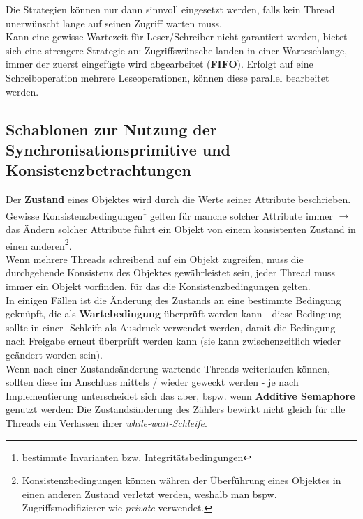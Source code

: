 \noindent
Die Strategien können nur dann sinnvoll eingesetzt werden, falls kein Thread unerwünscht lange auf seinen Zugriff warten muss.\\
Kann eine gewisse Wartezeit für Leser/Schreiber nicht garantiert werden, bietet sich eine strengere Strategie an: Zugriffswünsche landen in einer Warteschlange, immer der zuerst eingefügte wird abgearbeitet (\textbf{FIFO}).
Erfolgt auf eine Schreiboperation mehrere Leseoperationen, können diese parallel bearbeitet werden.


\subsection{Schablonen zur Nutzung der Synchronisationsprimitive und Konsistenzbetrachtungen}

Der \textbf{Zustand} eines Objektes wird durch die Werte seiner Attribute beschrieben.\\

\noindent
Gewisse Konsistenzbedingungen\footnote{bestimmte Invarianten bzw. Integritätsbedingungen} gelten für manche solcher Attribute immer $\rightarrow$ das Ändern solcher Attribute führt ein Objekt von einem konsistenten Zustand in einen anderen\footnote{
Konsistenzbedingungen können währen der Überführung eines Objektes in einen anderen Zustand verletzt werden, weshalb man bspw. Zugriffsmodifizierer wie \textit{private} verwendet.
}.\\

\noindent
Wenn mehrere Threads schreibend auf ein Objekt zugreifen, muss die durchgehende Konsistenz des Objektes gewährleistet sein, jeder Thread muss immer ein Objekt vorfinden, für das die Konsistenzbedingungen gelten.\\

\noindent
In einigen Fällen ist die Änderung des Zustands an eine bestimmte Bedingung geknüpft, die als \textbf{Wartebedingung} überprüft werden kann - diese Bedingung sollte in einer -Schleife als Ausdruck verwendet werden, damit die Bedingung nach Freigabe erneut überprüft werden kann (sie kann zwischenzeitlich wieder geändert worden sein).\\

\noindent
Wenn nach einer Zustandsänderung wartende Threads weiterlaufen können, sollten diese im Anschluss mittels / wieder geweckt werden - je nach Implementierung unterscheidet sich das aber, bspw. wenn \textbf{Additive Semaphore} genutzt werden: Die Zustandsänderung des Zählers bewirkt nicht gleich für alle Threads ein Verlassen ihrer \textit{while-wait-Schleife}.\\


